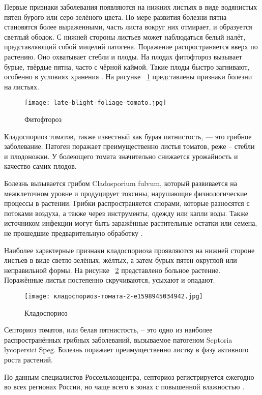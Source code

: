 Первые признаки заболевания появляются на нижних листьях в виде водянистых пятен бурого или серо-зелёного цвета. По мере развития болезни пятна становятся более выраженными, часть листа вокруг них отмирает, и образуется светлый ободок. С нижней стороны листьев может наблюдаться белый налёт, представляющий собой мицелий патогена. Поражение распространяется вверх по растению. Оно охватывает стебли и плоды. На плодах фитофтороз вызывает бурые, твёрдые пятна, часто с чёрной каймой. Такие плоды быстро загнивают, особенно в условиях хранения \cite{plant3}.
На рисунке ~\ref{templ:image2} представлены признаки болезни на листьях.
\begin{figure}[h]
	\texttt{[image: late-blight-foliage-tomato.jpg]}
	\caption{Фитофтороз}
	\label{templ:image2}
\end{figure}

Кладоспориоз томатов, также известный как бурая пятнистость, — это грибное заболевание. Патоген поражает преимущественно листья томатов, реже -- стебли и плодоножки. У болеющего томата значительно снижается урожайность и качество самих плодов.

Болезнь вызывается грибом Cladosporium fulvum, который развивается на межклеточном уровне и продуцирует токсины, нарушающие физиологические процессы в растении. Грибки распространяется спорами, которые разносятся с потоками воздуха, а также через инструменты, одежду или капли воды. Также источником инфекции могут быть заражённые растительные остатки или семена, не прошедшие предварительную обработку \cite{plant11}.

Наиболее характерные признаки кладоспориоза проявляются на нижней стороне листьев в виде светло-зелёных, жёлтых, а затем бурых пятен округлой или неправильной формы. На рисунке ~\ref{templ:image3} представлено больное растение. Поражённые листья постепенно скручиваются, усыхают и опадают.

\begin{figure}[h]
	\texttt{[image: кладоспориоз-томата-2-e1598945034942.jpg]}
	\caption{Кладоспориоз}
	\label{templ:image3}
\end{figure}

Септориоз томатов, или белая пятнистость, -- это одно из наиболее распространённых грибных заболеваний, вызываемое патогеном Septoria lycopersici Speg. Болезнь поражает преимущественно листву в фазу активного роста растений.

По данным специалистов Россельхозцентра, септориоз регистрируется ежегодно во всех регионах России, но чаще всего в зонах с повышенной влажностью \cite{plant8}.

